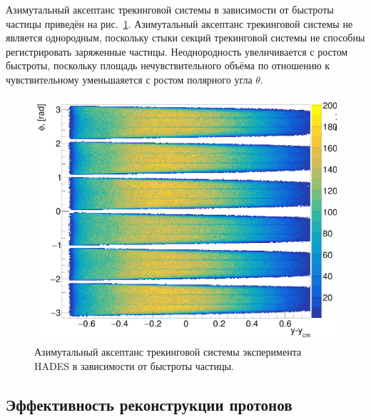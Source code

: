 Азимутальный аксептанс трекинговой системы в зависимости от быстроты частицы приведён на рис.~\ref{fig:hades_phi_y}.
Азимутальный аксептанс трекинговой системы не является однородным, поскольку стыки секций трекинговой системы не способны регистрировать заряженные частицы.
Неоднородность увеличивается с ростом быстроты, поскольку площадь нечувствительного объёма по отношению к чувствительному уменьшаяется с ростом полярного угла $\theta$. 
%
\begin{figure}[ht]
\begin{center}
\includegraphics[width=0.95\linewidth]{images/hades_phi_y.png}
\caption{Азимутальный аксептанс трекинговой системы эксперимента HADES в зависимости от быстроты частицы.}
\label{fig:hades_phi_y}
\end{center}
\end{figure}

\subsection{Эффективность реконструкции протонов}

